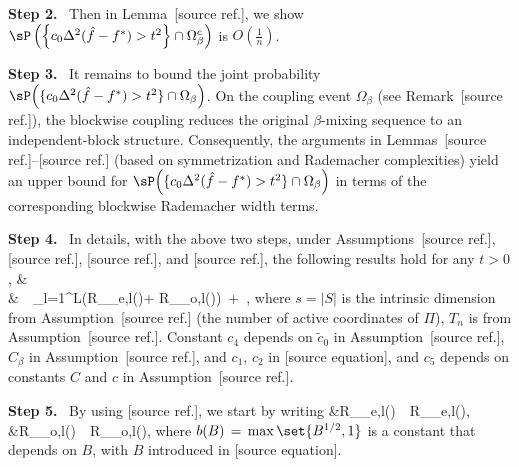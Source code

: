 \documentclass[twoside,11pt]{article}
\makeatletter
\newcommand{\step}[1]{\par\medskip\noindent\textbf{#1.}\ }
\newcommand{\discardlabel}[1]{}
\newcommand{\discardtwo}[2]{}
\newcommand{\legacyref}[1]{\textup{[source ref.]}}
\newcommand{\legacyeqref}[1]{\textup{[source equation]}}
\newenvironment{legacycomparison}{%
  \begingroup\color{legacygray}%
  \let\label\discardlabel
  \let\originallabel\discardlabel
  \let\ref\legacyref
  \let\pageref\legacyref
  \let\eqref\legacyeqref
  \let\cref\legacyref
  \let\Cref\legacyref
  \let\autoref\legacyref
  \let\aliasref\discardtwo
}{\endgroup}
\newcommand{\aliasref}[2]{%
  \@ifundefined{r@#2}{}{%
    \expandafter\let\csname r@#1\expandafter\endcsname\csname r@#2\endcsname}}
\makeatother
\begin{document}
\begin{legacycomparison}
\step{Step 2}
Then in Lemma~\ref{lemma_beta_decomp}, we show $\sP\left(\left\{ c_0\Delta^2(\hat f - f^*) > t^2\right\} \cap \Omega_{\beta}^{c}\right)$ is $O(\frac{1}{n})$.


\step{Step 3} 
It remains to bound the joint probability
$\sP\!\left(\{c_0\Delta^2(\hat f-f^*)>t^2\}\cap \Omega_\beta\right)$.
On the coupling event $\Omega_\beta$ (see Remark~\ref{remark:joint}),
the blockwise coupling reduces the original $\beta$-mixing sequence to an
independent-block structure. Consequently, the arguments in
Lemmas~\ref{lemma12}--\ref{lem_huber_rate} (based on symmetrization and
Rademacher complexities) yield an upper bound for
$\sP\!\left(\{c_0\Delta^2(\hat f-f^*)>t^2\}\cap \Omega_\beta\right)$
in terms of the corresponding blockwise Rademacher width terms. 
\step{Step 4} 
In details, with the above two steps, under Assumptions~\ref{Assumption 1.}, \ref{assumptionA}, \ref{assump:lip}, and \ref{ass:tail_multi_d}, the following results hold for any $t > 0$, 
\bea
&\sP{}  
\\ & \,\leq\, \sum_{l=1}^L\Big(R_{_{e,l}}(\gF \cap {})+ R_{_{o,l}}(\gF \cap {})\Big) \,+\, , 
\bea  where $s = |S|$ is the intrinsic dimension from Assumption~\ref{assump:lip} (the number of active coordinates of $\Pi$), $T_n$ is from Assumption~\ref{ass:tail_multi_d}. Constant $c_{4}$ depends on $\tilde c_0$ in Assumption~\ref{ass:tail_multi_d}, $C_{\beta}$ in Assumption~\ref{ass_c_beta}, and $c_1$, $c_2$ in \eqref{beta_constants}, and $c_5$ depends on constants $C$ and $c$ in Assumption~\ref{asm:m}.

\step{Step 5}
By using \cref{lem_17},  we start by writing
\bea 
&R_{_{e,l}}\left(\gF\cap {}\right) \,\leq\, R_{_{e,l}}\left(\gF\cap {}\right), \,\,\,\,\,\, \\
&R_{_{o,l}}\left(\gF\cap {}\right) \,\leq\, R_{_{o,l}}\left(\gF\cap {}\right),
\bea 
where $b(B) \,=\, \max\set{B^{1/2},1}$ is a constant that depends on $B$, with $B$ introduced in \eqref{F_2}. 


\end{legacycomparison}
\end{document}
